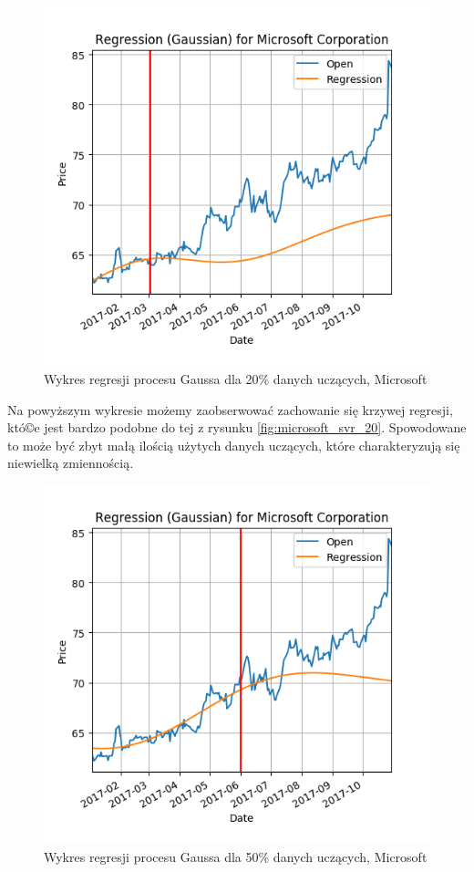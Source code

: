 \begin{figure}[h!]
\centering
\includegraphics[width=150mm]{pictures/plots/microsoft_gpr_20.png}
\caption{Wykres regresji procesu Gaussa dla 20\% danych uczących, Microsoft}
\label{fig:microsoft_gpr_20}
\end{figure}

Na powyższym wykresie możemy zaobserwować zachowanie się krzywej regresji, któ©e jest bardzo podobne do tej z rysunku \ref{fig:microsoft_svr_20}.
Spowodowane to może być zbyt małą ilością użytych danych uczących, które charakteryzują się niewielką zmiennością.\\

\begin{figure}[h!]
\centering
\includegraphics[width=150mm]{pictures/plots/microsoft_gpr_50.png}
\caption{Wykres regresji procesu Gaussa dla 50\% danych uczących, Microsoft}
\label{fig:microsoft_gpr_50}
\end{figure}

